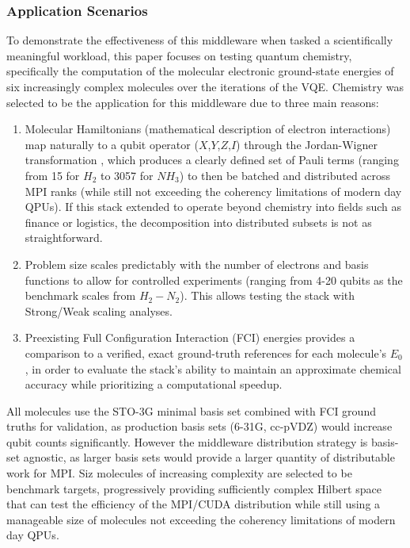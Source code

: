 \subsubsection{Application Scenarios}
To demonstrate the effectiveness of this middleware when tasked a scientifically meaningful workload, this paper focuses on testing 
quantum chemistry, specifically the computation of the molecular electronic ground-state energies of six increasingly complex molecules over the iterations of the VQE. Chemistry was selected to be the  
application for this middleware due to three main reasons: 
    \begin{enumerate}
        \item Molecular Hamiltonians (mathematical description of electron interactions) map naturally to a qubit operator ($X$,$Y$,$Z$,$I$) through the Jordan-Wigner transformation \parencite{peruzzo2014variational}, which produces a clearly defined set of Pauli terms (ranging from 15 for $H_2$ to 3057 for $NH_{3}$) to then be batched and distributed across MPI ranks (while still not exceeding the coherency limitations of modern day QPUs). If this stack extended to operate beyond chemistry into fields such as finance or logistics, the decomposition into distributed subsets is not as straightforward. 
        \item Problem size scales predictably with the number of electrons and basis functions to allow for controlled experiments (ranging from 4-20 qubits as the benchmark scales from $H_2 - N_2$). This allows testing the stack with Strong/Weak scaling analyses.  
        \item Preexisting Full Configuration Interaction (FCI) energies provides a comparison to a verified, exact ground-truth references for each molecule's $E_0$ \parencite{szabo1996modernquantumchemistry}, in order to evaluate the stack's ability to maintain an approximate chemical accuracy while prioritizing a computational speedup. 
    \end{enumerate}

All molecules use the STO-3G minimal basis set \parencite{szabo1996modernquantumchemistry} 
combined with FCI ground truths for validation, as production basis sets (6-31G, cc-pVDZ) would increase qubit counts significantly. However the 
middleware distribution strategy is basis-set agnostic, as larger basis sets would provide a larger quantity of distributable work for MPI. 
Siz molecules of increasing complexity are selected to be benchmark targets, progressively providing sufficiently complex Hilbert space that can test the 
efficiency of the MPI/CUDA distribution while still using a manageable size of molecules not exceeding the coherency limitations of modern day QPUs. 

